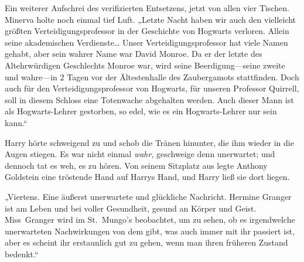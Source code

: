 Ein weiterer Aufschrei des verifizierten Entsetzens, jetzt von allen vier Tischen.
Minerva holte noch einmal tief Luft.
„Letzte Nacht haben wir auch den vielleicht größten Verteidigungsprofessor in der Geschichte von Hogwarts verloren. Allein seine akademischen Verdienste… Unser Verteidigungsprofessor hat viele Namen gehabt, aber sein wahrer Name war David Monroe. Da er der letzte des Altehrwürdigen Geschlechts Monroe war, wird seine Beerdigung—seine zweite und wahre—in 2 Tagen vor der Ältestenhalle des Zaubergamots stattfinden. Doch auch für den Verteidigungsprofessor von Hogwarts, für unseren Professor Quirrell, soll in diesem Schloss eine Totenwache abgehalten werden. Auch dieser Mann ist als Hogwarts-Lehrer gestorben, so edel, wie es ein Hogwarts-Lehrer nur sein kann.“

Harry hörte schweigend zu und schob die Tränen hinunter, die ihm wieder in die Augen stiegen. Es war nicht einmal \emph{wahr}, geschweige denn unerwartet; und dennoch tat es weh, es zu hören.
Von seinem Sitzplatz aus legte Anthony Goldstein eine tröstende Hand auf Harrys Hand, und Harry ließ sie dort liegen.

„Viertens. Eine äußerst unerwartete und glückliche Nachricht. Hermine Granger ist am Leben und bei voller Gesundheit, gesund an Körper und Geist. Miss~Granger wird im St.~Mungo’s beobachtet, um zu sehen, ob es irgendwelche unerwarteten Nachwirkungen von dem gibt, was auch immer mit ihr passiert ist, aber es scheint ihr erstaunlich gut zu gehen, wenn man ihren früheren Zustand bedenkt.“

